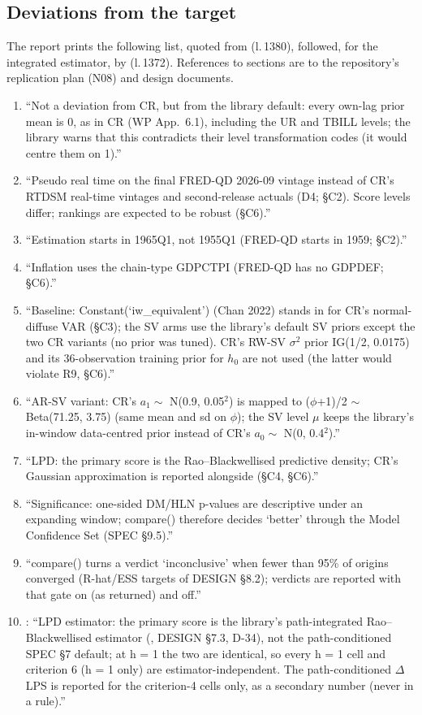 \subsection{Deviations from the target}\label{app:cr-deviations}

The report prints the following list, quoted from  (l.\,1380), followed, for the
integrated estimator, by  (l.\,1372).
References to sections are to the repository's replication plan (N08) and design documents.
\begin{enumerate}\small
\item ``Not a deviation from CR, but from the library default: every own-lag prior mean is 0, as in
CR (WP App.~6.1), including the UR and TBILL levels; the library warns that this contradicts their
level transformation codes (it would centre them on 1).''
\item ``Pseudo real time on the final FRED-QD 2026-09 vintage instead of CR's RTDSM real-time
vintages and second-release actuals (D4; \S C2). Score levels differ; rankings are expected to be
robust (\S C6).''
\item ``Estimation starts in 1965Q1, not 1955Q1 (FRED-QD starts in 1959; \S C2).''
\item ``Inflation uses the chain-type GDPCTPI (FRED-QD has no GDPDEF; \S C6).''
\item ``Baseline: Constant(`iw\_equivalent') (Chan 2022) stands in for CR's normal-diffuse VAR
(\S C3); the SV arms use the library's default SV priors except the two CR variants (no prior was
tuned). CR's RW-SV $\sigma^2$ prior IG(1/2, 0.0175) and its 36-observation training prior for $h_0$
are not used (the latter would violate R9, \S C6).''
\item ``AR-SV variant: CR's $a_1 \sim$ N(0.9, 0.05$^2$) is mapped to ($\phi$+1)/2 $\sim$ Beta(71.25,
3.75) (same mean and sd on $\phi$); the SV level $\mu$ keeps the library's in-window data-centred
prior instead of CR's $a_0 \sim$ N(0, 0.4$^2$).''
\item ``LPD: the primary score is the Rao--Blackwellised predictive density; CR's Gaussian
approximation is reported alongside (\S C4, \S C6).''
\item ``Significance: one-sided DM/HLN p-values are descriptive under an expanding window; compare()
therefore decides `better' through the Model Confidence Set (SPEC \S 9.5).''
\item ``compare() turns a verdict `inconclusive' when fewer than 95\% of origins converged
(R-hat/ESS targets of DESIGN \S 8.2); verdicts are reported with that gate on (as returned) and
off.''
\item[] : ``LPD estimator: the primary score is the library's
path-integrated Rao--Blackwellised estimator (, DESIGN \S 7.3, D-34),
not the path-conditioned SPEC \S 7 default; at h = 1 the two are identical, so every h = 1 cell and
criterion 6 (h = 1 only) are estimator-independent. The path-conditioned $\Delta$LPS is reported for
the criterion-4 cells only, as a secondary number (never in a rule).''
\end{enumerate}
